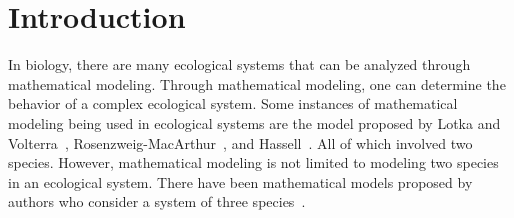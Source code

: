 \chapter{Introduction}\label{chapter:introduction}

In biology, there are many ecological systems that can be analyzed through mathematical modeling. Through mathematical modeling, one can determine the behavior of a complex ecological system. Some instances of mathematical modeling being used in ecological systems are the model proposed by Lotka and Volterra~\cite{brauer_castillo-chávez_2012}, Rosenzweig-MacArthur~\cite{doi:10.1086/282272}, and Hassell~\cite{hassell2020dynamics}. All of which involved two species. However, mathematical modeling is not limited to modeling two species in an ecological system. There have been mathematical models proposed by authors who consider a system of three species~\cite{JANA2021100942,FREEDMAN1977257,doi:10.1080/02286203.2020.1839168}.